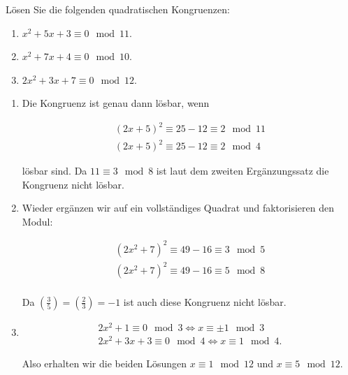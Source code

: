
\begin{exercise}

Lösen Sie die folgenden quadratischen Kongruenzen:

\begin{enumerate}[label = (\alph*)]
    \item $x^2 + 5x + 3 \equiv 0 \mod{11}$.
    \item $x^2 + 7x + 4 \equiv 0 \mod{10}$.
    \item $2x^2 + 3x + 7 \equiv 0 \mod{12}$.
\end{enumerate}

\end{exercise}


\begin{solution}

\phantom{}

\begin{enumerate}[label = (\alph*)]
    \item Die Kongruenz ist genau dann lösbar, wenn

    \begin{align*}
        (2x + 5)^2 \equiv 25 - 12 \equiv 2 \mod{11} \\
        (2x + 5)^2 \equiv 25 - 12 \equiv 2 \mod{4}
    \end{align*}

    lösbar sind. Da $11 \equiv 3 \mod{8}$ ist laut dem zweiten
    Ergänzungssatz die Kongruenz nicht lösbar.

    \item Wieder ergänzen wir auf ein vollständiges Quadrat
    und faktorisieren den Modul:

    \begin{align*}
        (2x^2 + 7)^2 \equiv 49 - 16 \equiv 3 \mod{5} \\
        (2x^2 + 7)^2 \equiv 49 - 16 \equiv 5 \mod{8} \\
    \end{align*}

    Da $\left(\frac{3}{5}\right) = \left(\frac{2}{3}\right) = -1$
    ist auch diese Kongruenz nicht lösbar.

    \item 

    \begin{align*}
        2x^2 + 1 \equiv 0 \mod{3} \iff x \equiv \pm 1 \mod{3} \\
        2x^2 + 3x + 3 \equiv 0 \mod{4} \iff x \equiv 1 \mod{4}.
    \end{align*}

    Also erhalten wir die beiden Lösungen $x \equiv 1 \mod{12}$ und
    $x \equiv 5 \mod{12}$.
\end{enumerate}

\end{solution}

